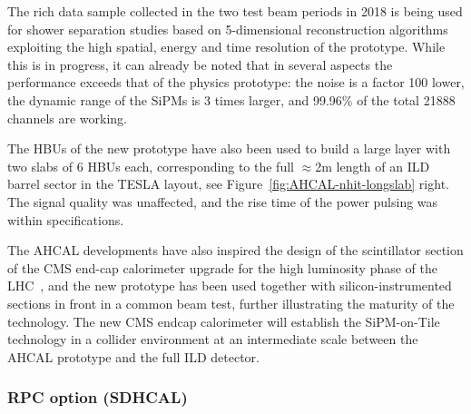 %
%
The rich data sample collected in the two test beam periods in 2018  is being used for shower separation studies based on 5-dimensional reconstruction algorithms exploiting the high spatial, energy and time resolution of the prototype. 
While this is in progress, it can already be noted that in several aspects the  performance exceeds that of the physics prototype: the noise is a factor 100 lower, the dynamic range of the SiPMs is 3 times larger, and 99.96\% of the total 21888 channels are working.

The HBUs of the new prototype have also been used to build a large layer with two slabs of 6 HBUs each, corresponding to the full $\approx$2m length of an ILD barrel sector in the TESLA layout, see Figure~\ref{fig:AHCAL-nhit-longslab} right. The signal quality was unaffected, and the rise time of the power pulsing was within specifications. 

The AHCAL developments have also inspired the design of the scintillator section of the CMS end-cap calorimeter upgrade for the high luminosity phase of the LHC~\cite{Collaboration:2293646}, and the new prototype has been used together with silicon-instrumented sections in front in a common beam test, further illustrating the maturity of the technology. 
The new CMS endcap calorimeter will establish the SiPM-on-Tile technology in a collider environment at an intermediate scale between the AHCAL prototype and the full ILD detector. 

\subsubsection{RPC option (SDHCAL)}


